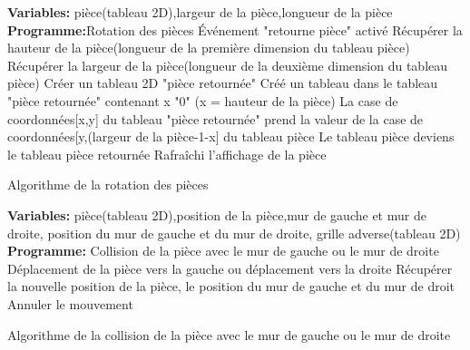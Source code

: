 \documentclass[a4paper, 11pt]{article}
\begin{document}
            \begin{algorithm}%
     			\centering
     			\begin{algorithmic}[1]
      				\STATE \textbf{Variables:} pièce(tableau 2D),largeur de la pièce,longueur de la pièce
      				\STATE \textbf{Programme:}Rotation des pièces
      				\STATE Événement "retourne pièce" activé
      				\STATE Récupérer la hauteur de la pièce(longueur de la première dimension du tableau pièce)
      				\STATE Récupérer la largeur de la pièce(longueur de la deuxième dimension du tableau pièce)
      				\STATE Créer un tableau 2D "pièce retournée"
      					\STATE Créé un tableau dans le tableau "pièce retournée" contenant x "0" (x = hauteur de la pièce)
      				\ENDFOR
         						\STATE La case de coordonnées[x,y] du tableau "pièce retournée" prend la valeur de la case de 									coordonnées[y,(largeur de la pièce-1-x] du tableau pièce
        					\ENDFOR
       					\ENDFOR
      				\STATE Le tableau pièce deviens le tableau pièce retournée
      				\STATE Rafraîchi l'affichage de la pièce
     			\end{algorithmic}
     			\caption{Algorithme de la rotation des pièces}
    		\end{algorithm}	
            
            
     		\begin{algorithm}%
     			\centering
     			\begin{algorithmic}[1]
      				\STATE \textbf{Variables:} pièce(tableau 2D),position de la pièce,mur de gauche et mur de droite, position du 					mur de gauche et du mur de droite, grille adverse(tableau 2D)
      				\STATE \textbf{Programme:} Collision de la pièce avec le mur de gauche ou le mur de droite
      				\STATE Déplacement de la pièce vers la gauche ou déplacement vers la droite
      				\STATE Récupérer la nouvelle position de la pièce, le position du mur de gauche et du mur de droit
      						\STATE	Annuler le mouvement
      					\ENDIF
     			\end{algorithmic}
     			\caption{Algorithme de la collision de la pièce avec le mur de gauche ou le mur de droite}
     		\end{algorithm}
     		
\end{document}
